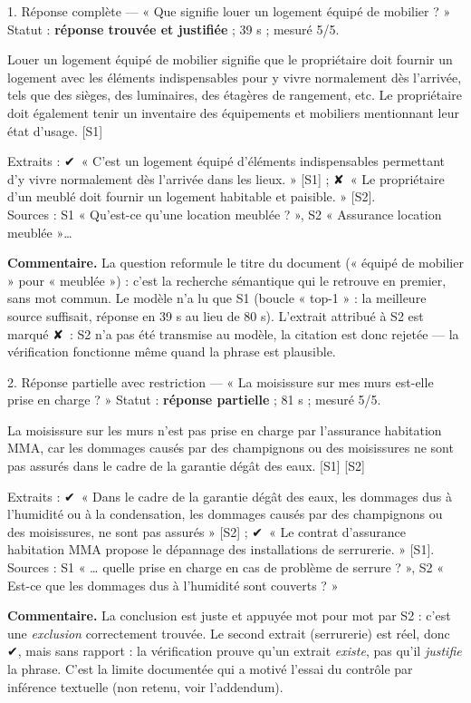 \documentclass[11pt,a4paper]{article}
\newcommand{\ok}{\textcolor{vert}{{\symb ✔}}}
\newcommand{\ko}{\textcolor{rouge}{{\symb ✘}}}
\begin{document}
\begin{question}{1. Réponse complète — « Que signifie louer un logement équipé de mobilier ? »}
Statut : \textbf{réponse trouvée et justifiée} ; 39 s ; mesuré 5/5.
\begin{reponse}
Louer un logement équipé de mobilier signifie que le propriétaire doit fournir un logement avec les
éléments indispensables pour y vivre normalement dès l'arrivée, tels que des sièges, des luminaires,
des étagères de rangement, etc. Le propriétaire doit également tenir un inventaire des équipements et
mobiliers mentionnant leur état d'usage. [S1]
\end{reponse}
Extraits : \ok\ « C'est un logement équipé d'éléments indispensables permettant d'y vivre
normalement dès l'arrivée dans les lieux. » [S1] ; \ko\ « Le propriétaire d'un meublé doit fournir
un logement habitable et paisible. » [S2].\\
Sources : S1 « Qu'est-ce qu'une location meublée ? », S2 « Assurance location meublée »…

\smallskip\textbf{Commentaire.} La question reformule le titre du document (« équipé de mobilier »
pour « meublée ») : c'est la recherche sémantique qui le retrouve en premier, sans mot commun.
Le modèle n'a lu que S1 (boucle « top-1 » : la meilleure source suffisait, réponse en 39 s au lieu
de 80 s). L'extrait attribué à S2 est marqué \ko\ : S2 n'a pas été transmise au modèle, la
citation est donc rejetée — la vérification fonctionne même quand la phrase est plausible.
\end{question}

\begin{question}{2. Réponse partielle avec restriction — « La moisissure sur mes murs est-elle prise en charge ? »}
Statut : \textbf{réponse partielle} ; 81 s ; mesuré 5/5.
\begin{reponse}
La moisissure sur les murs n'est pas prise en charge par l'assurance habitation MMA, car les
dommages causés par des champignons ou des moisissures ne sont pas assurés dans le cadre de la
garantie dégât des eaux. [S1] [S2]
\end{reponse}
Extraits : \ok\ « Dans le cadre de la garantie dégât des eaux, les dommages dus à l'humidité ou à la
condensation, les dommages causés par des champignons ou des moisissures, ne sont pas assurés »
[S2] ; \ok\ « Le contrat d'assurance habitation MMA propose le dépannage des installations de
serrurerie. » [S1].\\
Sources : S1 « … quelle prise en charge en cas de problème de serrure ? », S2 « Est-ce que les
dommages dus à l'humidité sont couverts ? »

\smallskip\textbf{Commentaire.} La conclusion est juste et appuyée mot pour mot par S2 : c'est
une \emph{exclusion} correctement trouvée. Le second extrait (serrurerie) est réel, donc
\ok, mais sans rapport : la vérification prouve qu'un extrait \emph{existe}, pas qu'il
\emph{justifie} la phrase. C'est la limite documentée qui a motivé l'essai du contrôle par inférence
textuelle (non retenu, voir l'addendum).
\end{question}
\end{document}
